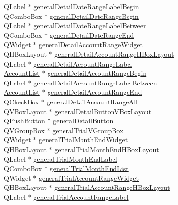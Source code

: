 \begin{CompactItemize}
\begin{tabbing}
\>QLabel $\ast$ \hyperlink{classReportStack_r20}{generalDetailDateRangeLabelBegin}\\
\>QComboBox $\ast$ \hyperlink{classReportStack_r21}{generalDetailDateRangeBegin}\\
\>QLabel $\ast$ \hyperlink{classReportStack_r22}{generalDetailDateRangeLabelBetween}\\
\>QComboBox $\ast$ \hyperlink{classReportStack_r23}{generalDetailDateRangeEnd}\\
\>QWidget $\ast$ \hyperlink{classReportStack_r24}{generalDetailAccountRangeWidget}\\
\>QHBoxLayout $\ast$ \hyperlink{classReportStack_r25}{generalDetailAccountRangeHBoxLayout}\\
\>QLabel $\ast$ \hyperlink{classReportStack_r26}{generalDetailAccountRangeLabel}\\
\>\hyperlink{classAccountList}{AccountList} $\ast$ \hyperlink{classReportStack_r27}{generalDetailAccountRangeBegin}\\
\>QLabel $\ast$ \hyperlink{classReportStack_r28}{generalDetailAccountRangeLabelBetween}\\
\>\hyperlink{classAccountList}{AccountList} $\ast$ \hyperlink{classReportStack_r29}{generalDetailAccountRangeEnd}\\
\>QCheckBox $\ast$ \hyperlink{classReportStack_r30}{generalDetailAccountRangeAll}\\
\>QVBoxLayout $\ast$ \hyperlink{classReportStack_r31}{generalDetailButtonVBoxLayout}\\
\>QPushButton $\ast$ \hyperlink{classReportStack_r32}{generalDetailButton}\\
\>QVGroupBox $\ast$ \hyperlink{classReportStack_r33}{generalTrialVGroupBox}\\
\>QWidget $\ast$ \hyperlink{classReportStack_r34}{generalTrialMonthEndWidget}\\
\>QHBoxLayout $\ast$ \hyperlink{classReportStack_r35}{generalTrialMonthEndHBoxLayout}\\
\>QLabel $\ast$ \hyperlink{classReportStack_r36}{generalTrialMonthEndLabel}\\
\>QComboBox $\ast$ \hyperlink{classReportStack_r37}{generalTrialMonthEndList}\\
\>QWidget $\ast$ \hyperlink{classReportStack_r38}{generalTrialAccountRangeWidget}\\
\>QHBoxLayout $\ast$ \hyperlink{classReportStack_r39}{generalTrialAccountRangeHBoxLayout}\\
\>QLabel $\ast$ \hyperlink{classReportStack_r40}{generalTrialAccountRangeLabel}\\

\end{tabbing}
\end{CompactItemize}
